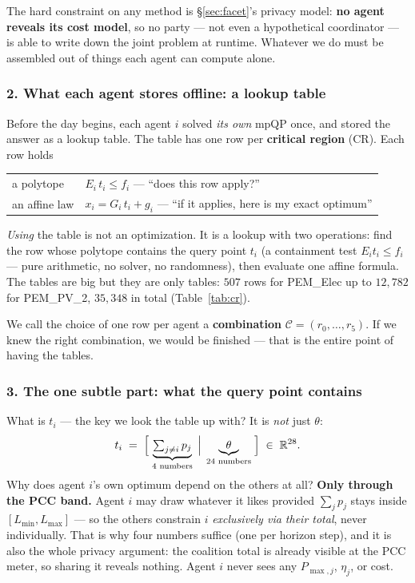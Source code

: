 \documentclass[11pt, letterpaper]{article}
\begin{document}
The hard constraint on any method is \S\ref{sec:facet}'s privacy model: \textbf{no agent reveals its
cost model}, so no party --- not even a hypothetical coordinator --- is able to write down the joint
problem at runtime. Whatever we do must be assembled out of things each agent can compute alone.

\subsubsection*{2. What each agent stores offline: a lookup table}
Before the day begins, each agent $i$ solved \emph{its own} mpQP once, and stored the answer as a
lookup table. The table has one row per \textbf{critical region} (CR). Each row holds
\begin{center}\small
\begin{tabular}{ll}
\toprule
a polytope & $E_i\,t_i\le f_i$ \quad --- ``does this row apply?''\\
an affine law & $x_i=G_i\,t_i+g_i$ \quad --- ``if it applies, here is my exact optimum''\\
\bottomrule
\end{tabular}
\end{center}
\emph{Using} the table is not an optimization. It is a lookup with two operations: find the row whose
polytope contains the query point $t_i$ (a containment test $E_it_i\le f_i$ --- pure arithmetic, no
solver, no randomness), then evaluate one affine formula. The tables are big but they are only
tables: $507$ rows for PEM\_Elec up to $12{,}782$ for PEM\_PV\_2, $35{,}348$ in total
(Table~\ref{tab:cr}).

We call the choice of one row per agent a \textbf{combination} $\mathcal C=(r_0,\dots,r_5)$. If we
knew the right combination, we would be finished --- that is the entire point of having the tables.

\subsubsection*{3. The one subtle part: what the query point contains}
What is $t_i$ --- the key we look the table up with? It is \emph{not} just $\theta$:
\[
  t_i \;=\; \Bigl[\;\underbrace{\textstyle\sum_{j\ne i} p_j}_{\text{4 numbers}}
  \;\Big|\;\underbrace{\theta}_{\text{24 numbers}}\;\Bigr]\;\in\;\mathbb R^{28}.
\]
Why does agent $i$'s own optimum depend on the others at all? \textbf{Only through the PCC band.}
Agent $i$ may draw whatever it likes provided $\sum_j p_j$ stays inside $[L_{\min},L_{\max}]$ --- so
the others constrain $i$ \emph{exclusively via their total}, never individually. That is why four
numbers suffice (one per horizon step), and it is also the whole privacy argument: the coalition
total is already visible at the PCC meter, so sharing it reveals nothing. Agent $i$ never sees any
$P_{\max,j}$, $\eta_j$, or cost.
\end{document}
